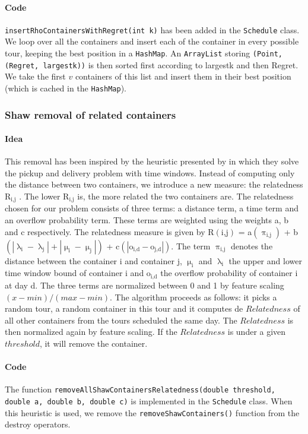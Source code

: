 \documentclass[12pt,a4paper]{article}
\begin{document}
\paragraph{Code}
\texttt{insertRhoContainersWithRegret(int k)} has been added in the \texttt{Schedule} class. We loop over all the containers and insert each of the container in every possible tour, keeping the best position in a \texttt{HashMap}. An \texttt{ArrayList} storing \texttt{(Point, (Regret, largest\textunderscore k))} is then sorted first according to largest\textunderscore k and then Regret. We take the first $v$ containers of this list and insert them in their best position (which is cached in the \texttt{HashMap}).
\subsubsection{Shaw removal of related containers}
\paragraph{Idea}This removal has been inspired by the heuristic presented by \cite{RopkeTW} in which they solve the pickup and delivery problem with time windows. Instead of computing only the distance between two containers, we introduce a new measure: the relatedness R$_{\text{i,j}}$ . The lower R$_{\text{i,j}}$ is, the more related the two containers are. The relatedness chosen for our problem consists of three terms: a distance term, a time term and an overflow probability term. These terms are weighted using the weights a, b and c respectively. The relatedness measure is given by R$(\text{i,j})$ = a$(\uppi _{\text{i,j}})$ + b$(|\uplambda _{\text{i}}- \uplambda _{\text{j}}| + |\upmu _{\text{i}}- \upmu _{\text{j}}|)$ + c$(|\text{o}_{\text{i,d}}-\text{o}_{\text{j,d}}|)$. The term $\uppi _{\text{i,j}}$ denotes the distance between the container i and container j, $\upmu _{\text{i}}$ and $\uplambda _{\text{i}}$ the upper and lower time window bound of container i and o$_{\text{i,d}}$ the overflow probability of container i at day d. The three terms are normalized between 0 and 1 by feature scaling $(x-min)/(max-min)$. The algorithm proceeds as follows: it picks a random tour, a random container in this tour and it computes de $Relatedness$ of all other containers from the tours scheduled the same day. The $Relatedness$ is then normalized again by feature scaling. If the $Relatedness$ is under a given $threshold$, it will remove the container. 
\paragraph{Code}The function \texttt{removeAllShawContainersRelatedness(double threshold, double a, double b, double c)} is implemented in the \texttt{Schedule} class. When this heuristic is used, we remove the \texttt{removeShawContainers()} function from the destroy operators.
\end{document}
